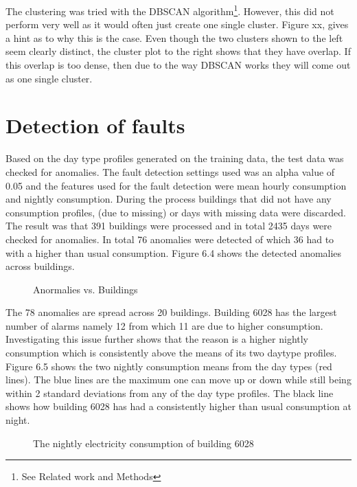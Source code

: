 The clustering was tried with the DBSCAN algorithm\footnote{See Related work and Methods}. However, this did not perform very well as it would often just create one single cluster. Figure xx, gives a hint as to why this is the case. Even though the two clusters shown to the left seem clearly distinct, the cluster plot to the right shows that they have overlap. If this overlap is too dense, then due to the way DBSCAN works they will come out as one single cluster.

\section*{Detection of faults}
Based on the day type profiles generated on the training data, the test data was checked for anomalies. The fault detection settings used was an alpha value of 0.05 and the features used for the fault detection were mean hourly consumption and nightly consumption. During the process buildings that did not have any consumption profiles, (due to missing) or days with missing data were discarded. The result was that 391 buildings were processed and in total 2435 days were checked for anomalies. In total 76 anomalies were detected of which 36 had to with a higher than usual consumption. Figure 6.4 shows the detected anomalies across buildings.
\begin{figure}
\begin{center}

\end{center}
\caption{Anormalies vs. Buildings}
\end{figure}

The 78 anomalies are spread across 20 buildings. Building 6028 has the largest number of alarms namely 12 from which 11 are due to higher consumption. Investigating this issue further shows that the reason is a higher nightly consumption which is consistently above the means of its two daytype profiles. Figure 6.5 shows the two nightly consumption means from the day types (red lines). The blue lines are the maximum one can move up or down while still being within 2 standard deviations from any of the day type profiles. The black line shows how building 6028 has had a consistently higher than usual consumption at night.
\begin{figure}
\begin{center}

\end{center}
\caption{The nightly electricity consumption of building 6028}
\end{figure}

